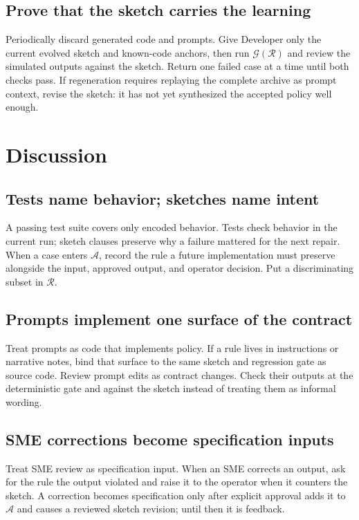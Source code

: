 \documentclass[11pt]{article}
\newcommand{\archive}{\mathcal{A}}
\newcommand{\regression}{\mathcal{R}}
\newcommand{\gate}{\mathcal{G}}
\begin{document}
\subsection{Prove that the sketch carries the learning}

Periodically discard generated code and prompts.  Give Developer only the current evolved
sketch and known-code anchors, then run $\gate(\regression)$ and review the simulated outputs
against the sketch.  Return one failed case at a time until both checks pass.  If regeneration
requires replaying the complete archive as prompt context, revise the sketch: it has not yet
synthesized the accepted policy well enough.

\section{Discussion}
\label{sec:discussion}

\subsection{Tests name behavior; sketches name intent}

A passing test suite covers only encoded behavior.  Tests check behavior in the current run;
sketch clauses preserve why a failure mattered for the next repair.  When a case enters
$\archive$, record the rule a future implementation must preserve alongside the input, approved
output, and operator decision.  Put a discriminating subset in $\regression$.

\subsection{Prompts implement one surface of the contract}

Treat prompts as code that implements policy.  If a rule lives in instructions or narrative
notes, bind that surface to the same sketch and regression gate as source code.  Review prompt
edits as contract changes.  Check their outputs at the deterministic gate and against the sketch
instead of treating them as informal wording.

\subsection{SME corrections become specification inputs}

Treat SME review as specification input.  When an SME corrects an output, ask for the rule the
output violated and raise it to the operator when it counters the sketch.  A correction becomes
specification only after explicit approval adds it to $\archive$ and causes a reviewed sketch
revision; until then it is feedback.
\end{document}
